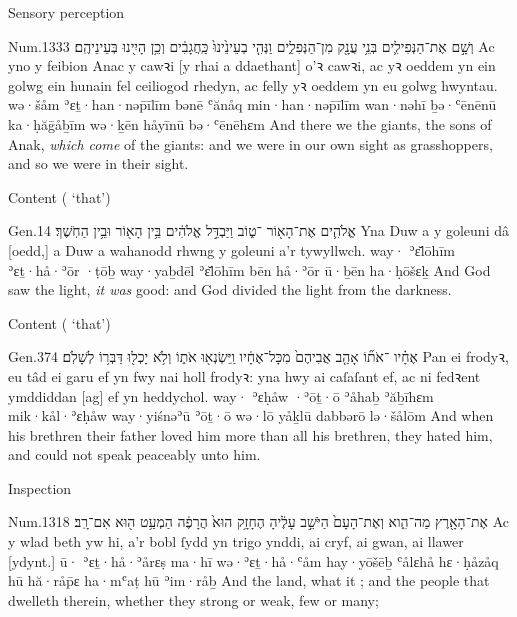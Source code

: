\begin{frame}{\ex Sensory perception}
	\begin{example}{Num.}{13}{33}{}{}
		\quoling
		{וְשָׁ֣ם  אֶת־הַנְּפִילִ֛ים בְּנֵ֥י עֲנָ֖ק מִן־הַנְּפִלִ֑ים וַנְּהִ֤י בְעֵינֵ֙ינוּ֙ כַּֽחֲגָבִ֔ים וְכֵ֥ן הָיִ֖ינוּ בְּעֵינֵיהֶֽם׃}
		{Ac yno y  feibion Anac y cawꝛi [y rhai a ddaethant] o’ꝛ cawꝛi, ac yꝛ oeddem yn ein golwg ein hunain fel ceiliogod rhedyn, ac felly yꝛ oeddem yn eu golwg hwyntau.}
		{wə·šåm  ʾɛṯ·han·nəp̄īlīm bənē ʿănåq min·han·nəp̄īlīm wan·nəhī ḇə·ʿēnēnū ka·ḥăḡåḇīm wə·ḵēn håyīnū bə·ʿēnēhɛm}
		{And there we  the giants, the sons of Anak, \emph{which come} of the giants: and we were in our own sight as grasshoppers, and so we were in their sight.}
	\end{example}
\end{frame}


\begin{frame}{\ex Content ( ‘that’)}
	\begin{example}{Gen.}{1}{4}{}{}
		\quoling
		{ אֱלֹהִ֛ים אֶת־הָא֖וֹר ־ט֑וֹב וַיַּבְדֵּ֣ל אֱלֹהִ֔ים בֵּ֥ין הָא֖וֹר וּבֵ֥ין הַחֹֽשֶׁךְ׃}
		{Yna Duw a  y goleuni  dâ [oedd,] a Duw a wahanodd rhwng y goleuni a’r tywyllwch.}
		{way· ʾɛ̆lōhīm ʾɛṯ·hå·ʾōr ·ṭōḇ way·yaḇdēl ʾɛ̆lōhīm bēn hå·ʾōr ū·ḇēn ha·ḥōšɛḵ}
		{And God saw the light,  \emph{it was} good: and God divided the light from the darkness.}
	\end{example}
\end{frame}


\begin{frame}{\ex Content ( ‘that’)}
	\begin{example}{Gen.}{37}{4}{}{}
		\quoling
		{ אֶחָ֗יו ־אֹת֞וֹ אָהַ֤ב אֲבִיהֶם֙ מִכָּל־אֶחָ֔יו וַֽיִּשְׂנְא֖וּ אֹת֑וֹ וְלֹ֥א יָכְל֖וּ דַּבְּר֥וֹ לְשָׁלֹֽם׃}
		{Pan  ei frodyꝛ,  eu tâd  ei garu ef yn fwy nai holl frodyꝛ: yna hwy ai caſaſant ef, ac ni fedꝛent ymddiddan [ag] ef yn heddychol.}
		{way· ʾɛḥåw ·ʾōṯ·ō ʾåhaḇ ʾăḇīhɛm mik·kål·ʾɛḥåw way·yiśnəʾū ʾōṯ·ō wə·lō yåḵlū dabbərō lə·šålōm}
		{And when his brethren   their father loved him more than all his brethren, they hated him, and could not speak peaceably unto him.}
	\end{example}
\end{frame}


\begin{frame}{\ex Inspection}
	\begin{example}{Num.}{13}{18}{}{}
		\quoling
		{ אֶת־הָאָ֖רֶץ מַה־הִ֑וא וְאֶת־הָעָם֙ הַיֹּשֵׁ֣ב עָלֶ֔יהָ הֶחָזָ֥ק הוּא֙ הֲרָפֶ֔ה הַמְעַ֥ט ה֖וּא אִם־רָֽב׃}
		{Ac  y wlad beth yw hi, a’r bobl ſydd yn trigo ynddi, ai cryf, ai gwan, ai llawer [ydynt.]}
		{ū· ʾɛṯ·hå·ʾårɛṣ ma·hī wə·ʾɛṯ·hå·ʿåm hay·yōšēḇ ʿålɛhå hɛ·ḥåzåq hū hă·råp̄ɛ ha·mʿaṭ hū ʾim·råḇ}
		{And  the land, what it ; and the people that dwelleth therein, whether they  strong or weak, few or many;}
	\end{example}
\end{frame}


